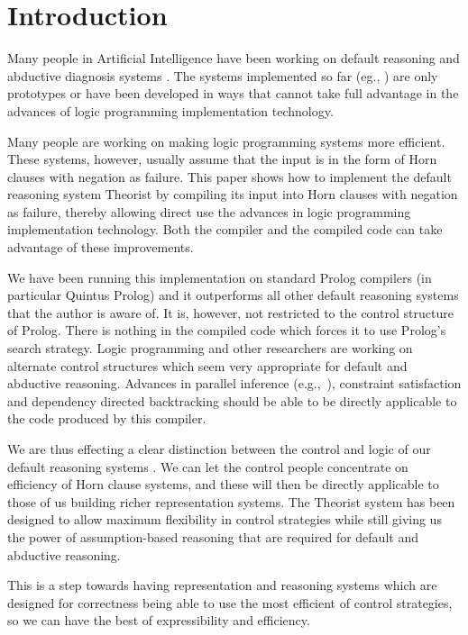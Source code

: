 \section{Introduction}
Many people in Artificial Intelligence have been working on default reasoning
and abductive diagnosis systems 
\cite{reiter80,mccarthy86,cox87,poole:lf}. The systems implemented so far
(eg., \cite{brewka86,lifschitz85,ginsberg87,pga}) are only prototypes or
have been developed in ways that cannot take full advantage in the
advances of logic programming implementation technology.

Many people are working on making logic programming systems more efficient.
These systems, however, usually assume that the input is in the form of
Horn clauses with negation as failure. This paper shows how to implement
the default reasoning system Theorist \cite{poole:lf,pga}
by compiling its input into Horn clauses with negation as failure, thereby
allowing direct
use the advances in logic programming implementation technology.
Both the compiler and the compiled code can take advantage of 
these improvements.

We have been running this implementation on standard
Prolog compilers (in particular Quintus Prolog) and it outperforms
all other default reasoning systems that the author is aware of.
It is, however, not restricted to the control structure of Prolog. There is
nothing in the compiled code which forces it to use Prolog's
search strategy.
Logic programming and other researchers are working on alternate
control structures which seem very appropriate for default 
and abductive reasoning.
Advances in parallel inference (e.g.,\ \cite{pie}),
constraint satisfaction \cite{dincbas,vanh} and dependency directed backtracking
\cite{dekleer86,doyle79,cox82} 
should be able to be directly applicable to the code produced by this compiler.

We are thus effecting a clear
distinction between the control and logic of our default reasoning systems
\cite{kowalski}. We can let the control people concentrate on efficiency
of Horn clause systems, and these will then be directly applicable to
those of us building richer representation systems.
The Theorist system has been designed to allow maximum flexibility in
control strategies while still giving us the power of assumption-based
reasoning that are required for default and abductive reasoning.

This is a step towards having representation and reasoning systems
which are designed for correctness being able to use the most
efficient of control
strategies, so we can have the best of expressibility and efficiency.
